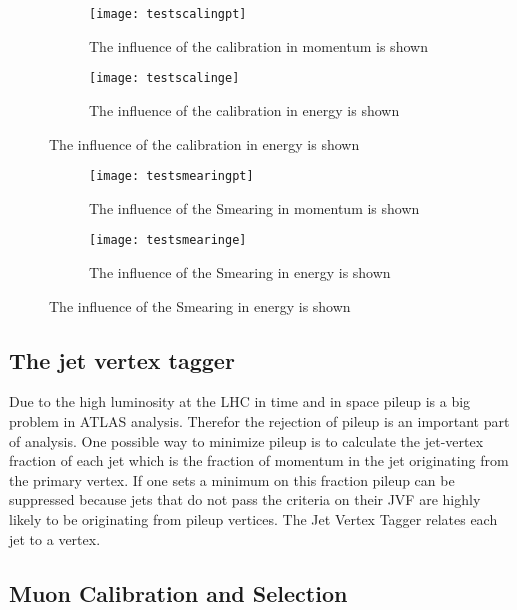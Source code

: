 \begin{figure}
\centering
\begin{subfigure}[b]{0.5\figwidth}
\texttt{[image: testscalingpt]}
\caption[Influence of the JES on the transversal momentum]{The influence of the calibration in momentum is shown}
\label{fig:testscalingpt}
\end{subfigure}
\quad
\begin{subfigure}[b]{0.5\figwidth}
\texttt{[image: testscalinge]}
\caption[Influence of the JES on the energy]{The influence of the calibration in energy is shown}
\label{fig:testscalinge}
\end{subfigure}
\end{figure}


\begin{figure}
\centering
\begin{subfigure}[b]{0.5\figwidth}
\texttt{[image: testsmearingpt]}
\caption[Influence of the Smearing on the transversal momentum]{The influence of the Smearing in momentum is shown}
\label{fig:testsmearingpt}
\end{subfigure}
\quad
\begin{subfigure}[b]{0.5\figwidth}
\texttt{[image: testsmearinge]}
\caption[Influence of the Smearing on the energy]{The influence of the Smearing in energy is shown}
\label{fig:testsmearinge}
\end{subfigure}
\end{figure}


\subsection{The jet vertex tagger}

Due to the high luminosity at the LHC in time and in space pileup is a big problem in ATLAS analysis. Therefor the rejection of pileup is an important part of analysis. One possible way to minimize pileup is to calculate the jet-vertex fraction of each jet which is the fraction of momentum in the jet originating from the primary vertex. If one sets a minimum on this fraction pileup can be suppressed because jets that do not pass the criteria on their JVF are highly likely to be originating from pileup vertices. The Jet Vertex Tagger relates each jet to a vertex.


\subsection{Muon Calibration and Selection}

